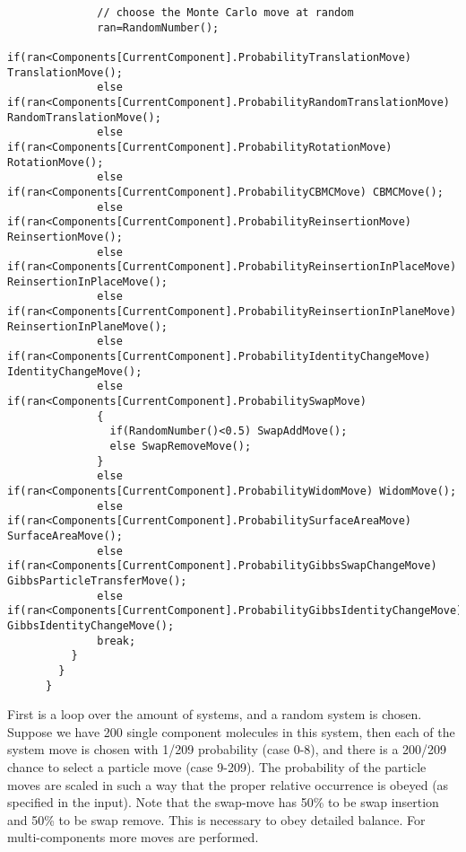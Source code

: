\begin{footnotesize}
\begin{verbatim}
              // choose the Monte Carlo move at random
              ran=RandomNumber();
              if(ran<Components[CurrentComponent].ProbabilityTranslationMove) TranslationMove();
              else if(ran<Components[CurrentComponent].ProbabilityRandomTranslationMove) RandomTranslationMove();
              else if(ran<Components[CurrentComponent].ProbabilityRotationMove) RotationMove();
              else if(ran<Components[CurrentComponent].ProbabilityCBMCMove) CBMCMove();
              else if(ran<Components[CurrentComponent].ProbabilityReinsertionMove) ReinsertionMove();
              else if(ran<Components[CurrentComponent].ProbabilityReinsertionInPlaceMove) ReinsertionInPlaceMove();
              else if(ran<Components[CurrentComponent].ProbabilityReinsertionInPlaneMove) ReinsertionInPlaneMove();
              else if(ran<Components[CurrentComponent].ProbabilityIdentityChangeMove) IdentityChangeMove();
              else if(ran<Components[CurrentComponent].ProbabilitySwapMove)
              {
                if(RandomNumber()<0.5) SwapAddMove();
                else SwapRemoveMove();
              }
              else if(ran<Components[CurrentComponent].ProbabilityWidomMove) WidomMove();
              else if(ran<Components[CurrentComponent].ProbabilitySurfaceAreaMove) SurfaceAreaMove();
              else if(ran<Components[CurrentComponent].ProbabilityGibbsSwapChangeMove) GibbsParticleTransferMove();
              else if(ran<Components[CurrentComponent].ProbabilityGibbsIdentityChangeMove) GibbsIdentityChangeMove();
              break;
          }
        }
      }
\end{verbatim}
\end{footnotesize}
First is a loop over the amount of systems, and a random system is chosen. Suppose we have 200 single component molecules in this system, then each of the system move is chosen
with 1/209 probability (case 0-8), and there is a 200/209 chance to select a particle move (case 9-209). The probability of the particle moves are scaled in such a way that
the proper relative occurrence is obeyed (as specified in the input). Note that the swap-move has 50\% to be swap insertion and 50\% to be swap remove. This is necessary
to obey detailed balance. For multi-components more moves are performed.

